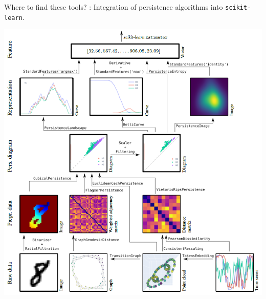 \begin{frame}[fragile]{Where to find these tools?}
	\pause
	:
	Integration of persistence algorithms into \texttt{scikit-learn}.
	\vspace*{-5pt}
	\begin{center}
		\includegraphics[scale=.59,angle=-90]{aux/giotto-tda_workflow}
	\end{center}
\end{frame}